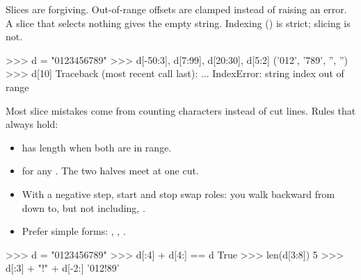 Slices are forgiving. Out-of-range offsets are clamped instead of raising an error. A slice
that selects nothing gives the empty string. Indexing () is strict; slicing is not.

\begin{pycode}
>>> d = "0123456789"
>>> d[-50:3], d[7:99], d[20:30], d[5:2]
('012', '789', '', '')
>>> d[10]
Traceback (most recent call last):
  ...
IndexError: string index out of range
\end{pycode}

\begin{boss}
Most slice mistakes come from counting characters instead of cut lines. Rules that always hold:
\begin{itemize}[itemsep=1pt]
\item {} has length  when both are in range.
\item {} for any . The two halves meet at one cut.
\item With a negative step, start and stop swap roles: you walk backward from  down to, but not including, .
\item Prefer simple forms: , , .
\end{itemize}
\begin{center}
\end{center}
\begin{pycode}
>>> d = "0123456789"
>>> d[:4] + d[4:] == d
True
>>> len(d[3:8])
5
>>> d[:3] + "!" + d[-2:]
'012!89'
\end{pycode}
\end{boss}

